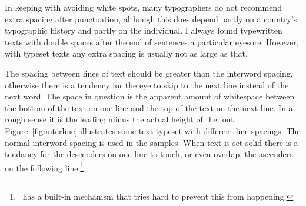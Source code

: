 \documentclass[10pt,a4paper,extrafontsizes]{memoir}
\begin{document}
\begin{paracol}{2}
\switchEng
    In keeping with avoiding white spots, many typographers do not
recommend extra spacing after punctuation, although this does depend
partly on a country's typographic history and partly on the individual.
I always found typewritten texts with double spaces after the end
of sentences a particular eyesore. However, with typeset texts any 
extra spacing is usually not as large as that.

    The spacing between lines of text 
should be greater than the interword
spacing, otherwise there is a tendency for the eye to skip to the
next line instead of the next word. The space in question is the apparent
amount of whitespace between the bottom of the text on one line and the top
of the text on the next line. In a rough sense it is the leading minus the
actual height of the font.
Figure~\ref{fig:interline} illustrates
some text typeset with different line spacings. The normal interword
spacing is used in the samples. When text is set solid there is a tendancy
for the descenders on one line to touch, or even overlap, the ascenders on the 
following line.\footnote{\tx\ has a built-in mechanism that tries hard to 
prevent this from happening.}
\end{paracol}
\end{document}

